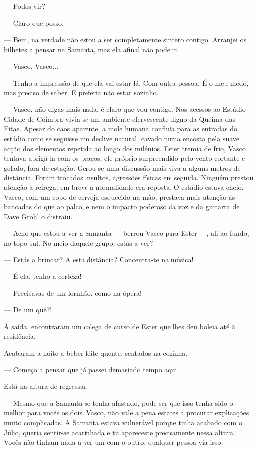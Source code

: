 --- Podes vir?

--- Claro que posso.

--- Bem, na verdade não estou a ser completamente sincero contigo.
  Arranjei os bilhetes a pensar na Samanta, mas ela afinal não pode ir.

--- Vasco, Vasco...

--- Tenho a impressão de que ela vai estar lá. Com outra pessoa. É o meu
  medo, mas preciso de saber. E preferia não estar sozinho.

--- Vasco, não digas mais nada, é claro que vou contigo. Nos acessos ao
  Estádio Cidade de Coimbra vivia-se um ambiente efervescente digno da Queima das Fitas. Apesar do caos
aparente, a mole humana confluía para as entradas do estádio como se
seguisse um declive natural, cavado numa encosta pela suave acção dos
elementos repetida ao longo dos milénios. Ester tremia de frio, Vasco
tentava abrigá-la com os braços, ele próprio surpreendido pelo vento
cortante e gelado, fora de estação. Gerou-se uma discussão mais viva a
alguns metros de distância. Foram trocados insultos, agressões físicas
em seguida. Ninguém prestou atenção à refrega; em breve a normalidade
era reposta. O estádio estava cheio. Vasco, com um copo de cerveja
esquecido na mão, prestava mais atenção às bancadas do que ao palco, e
nem o impacto poderoso da voz e da guitarra de Dave Grohl o distraiu.

--- Acho que estou a ver a Samanta --- berrou Vasco para Ester ---, ali ao
  fundo, no topo sul. No meio daquele grupo, estás a ver?

--- Estás a brincar? A esta distância? Concentra-te na música!

--- É ela, tenho a certeza!

--- Precisavas de um lornhão, como na ópera!

--- De um quê?!


À saída, encontraram um colega de curso de Ester que lhes deu boleia até
à residência.

Acabaram a noite a beber leite quente, sentados na cozinha.

--- Começo a pensar que já passei demasiado tempo aqui.


Está na altura de regressar.

--- Mesmo que a Samanta se tenha afastado, pode ser que isso tenha sido o
  melhor para vocês os dois. Vasco, não vale a pena estares a procurar
  explicações muito complicadas. A Samanta estava vulnerável porque
  tinha acabado com o Júlio, queria sentir-se acarinhada e tu apareceste
  precisamente nessa
altura. Vocês não tinham nada a ver um com o outro, qualquer pessoa via
isso.

